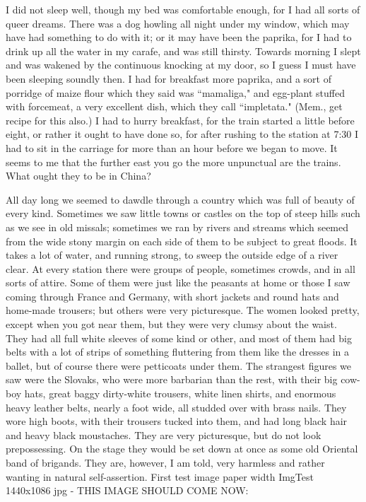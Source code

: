 \renewcommand{\varCaption}{John Van Eyssen as Jonathan Harker in Dracula, released in the United States as Horror of Dracula, 1958.}
\renewcommand{\varImgPath}{_content/Dracula_John_Van_Eyssen_as_Jonathan_Harker-608x336.jpg}


I did not sleep well, though my bed was comfortable enough, for I had all sorts of queer dreams. There was a dog howling all night under my window, which may have had something to do with it; or it may have been the paprika, for I had to drink up all the water in my carafe, and was still thirsty. Towards morning I slept and was wakened by the continuous knocking at my door, so I guess I must have been sleeping soundly then. I had for breakfast more paprika, and a sort of porridge of maize flour which they said was ``mamaliga," and egg-plant stuffed with forcemeat, a very excellent dish, which they call ``impletata." (Mem., get recipe for this also.) I had to hurry breakfast, for the train started a little before eight, or rather it ought to have done so, for after rushing to the station at 7:30 I had to sit in the carriage for more than an hour before we began to move. It seems to me that the further east you go the more unpunctual are the trains. What ought they to be in China?

All day long we seemed to dawdle through a country which was full of beauty of every kind. Sometimes we saw little towns or castles on the top of steep hills such as we see in old missals; sometimes we ran by rivers and streams which seemed from the wide stony margin on each side of them to be subject to great floods. It takes a lot of water, and running strong, to sweep the outside edge of a river clear. At every station there were groups of people, sometimes crowds, and in all sorts of attire. Some of them were just like the peasants at home or those I saw coming through France and Germany, with short jackets and round hats and home-made trousers; but others were very picturesque. The women looked pretty, except when you got near them, but they were very clumsy about the waist. They had all full white sleeves of some kind or other, and most of them had big belts with a lot of strips of something fluttering from them like the dresses in a ballet, but of course there were petticoats under them. The strangest figures we saw were the Slovaks, who were more barbarian than the rest, with their big cow-boy hats, great baggy dirty-white trousers, white linen shirts, and enormous heavy leather belts, nearly a foot wide, all studded over with brass nails. They wore high boots, with their trousers tucked into them, and had long black hair and heavy black moustaches. They are very picturesque, but do not look prepossessing. On the stage they would be set down at once as some old Oriental band of brigands. They are, however, I am told, very harmless and rather wanting in natural self-assertion. First test image paper width ImgTest 1440x1086 jpg - THIS IMAGE SHOULD COME NOW:

